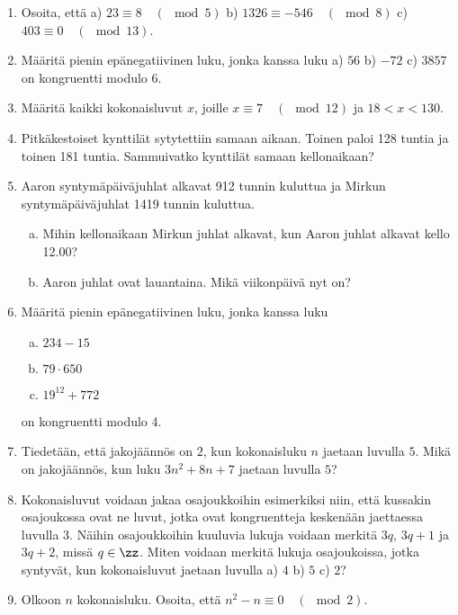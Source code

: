 \begin{enumerate}

\item
Osoita, että a) $23 \equiv 8 \quad (\mod 5)$ b) $1326 \equiv -546\quad (\mod 8)$ c) $403 \equiv 0 \quad (\mod 13)$.

\item
Määritä pienin epänegatiivinen luku, jonka kanssa luku a) $56$ b) $-72$ c) $3857$ on kongruentti modulo $6$.

\item
Määritä kaikki kokonaisluvut $x$, joille $x \equiv 7 \quad (\mod 12)$ ja $18 < x < 130$.

\item
Pitkäkestoiset kynttilät sytytettiin samaan aikaan. Toinen paloi 128 tuntia ja toinen 181 tuntia. Sammuivatko kynttilät samaan kellonaikaan?

\item Aaron syntymäpäiväjuhlat alkavat 912 tunnin kuluttua ja Mirkun syntymäpäiväjuhlat 1419 tunnin kuluttua.
\begin{enumerate}[a)]
\item Mihin kellonaikaan Mirkun juhlat alkavat, kun Aaron juhlat alkavat kello 12.00?
\item Aaron juhlat ovat lauantaina. Mikä viikonpäivä nyt on?
\end{enumerate}

\item Määritä pienin epänegatiivinen luku, jonka kanssa luku
\begin{enumerate}[a)]
\item $234 - 15$
\item $79 \cdot 650$
\item $19^{12} + 772$
\end{enumerate}
on kongruentti modulo 4.

\item
Tiedetään, että jakojäännös on $2$, kun kokonaisluku $n$ jaetaan luvulla $5$. Mikä on jakojäännös, kun luku $3n^2 + 8n + 7$ jaetaan luvulla $5$?

\item Kokonaisluvut voidaan jakaa osajoukkoihin esimerkiksi niin, että kussakin osajoukossa ovat ne luvut, jotka ovat kongruentteja keskenään jaettaessa luvulla 3. Näihin osajoukkoihin kuuluvia lukuja voidaan merkitä $3q$, $3q + 1$ ja $3q + 2$, missä $q \in \zz$. Miten voidaan merkitä lukuja osajoukoissa, jotka syntyvät, kun kokonaisluvut jaetaan luvulla a) $4$ b) $5$ c) $2$?

\item Olkoon $n$ kokonaisluku. Osoita, että $n^2 - n \equiv 0\quad (\mod 2)$.


\end{enumerate}
